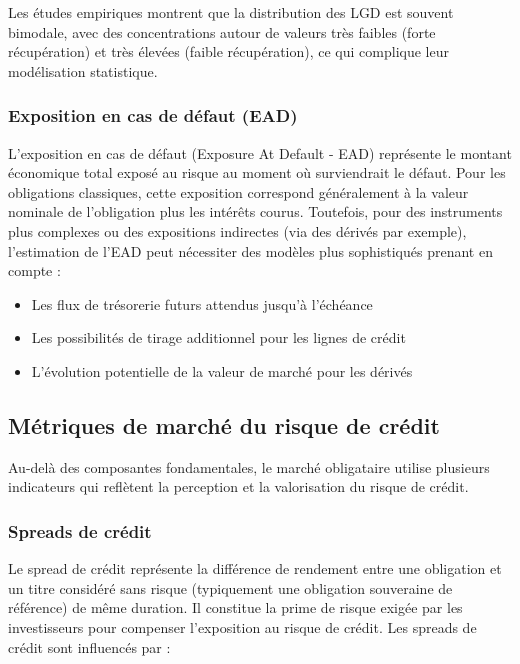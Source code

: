 Les études empiriques montrent que la distribution des LGD est souvent bimodale, avec des concentrations autour de valeurs très faibles (forte récupération) et très élevées (faible récupération), ce qui complique leur modélisation statistique.

\subsubsection{Exposition en cas de défaut (EAD)}

L'exposition en cas de défaut (Exposure At Default - EAD) représente le montant économique total exposé au risque au moment où surviendrait le défaut. Pour les obligations classiques, cette exposition correspond généralement à la valeur nominale de l'obligation plus les intérêts courus. Toutefois, pour des instruments plus complexes ou des expositions indirectes (via des dérivés par exemple), l'estimation de l'EAD peut nécessiter des modèles plus sophistiqués prenant en compte :

\begin{itemize}
    \item Les flux de trésorerie futurs attendus jusqu'à l'échéance
    \item Les possibilités de tirage additionnel pour les lignes de crédit
    \item L'évolution potentielle de la valeur de marché pour les dérivés
\end{itemize}

\subsection{Métriques de marché du risque de crédit}

Au-delà des composantes fondamentales, le marché obligataire utilise plusieurs indicateurs qui reflètent la perception et la valorisation du risque de crédit.

\subsubsection{Spreads de crédit}

Le spread de crédit représente la différence de rendement entre une obligation et un titre considéré sans risque (typiquement une obligation souveraine de référence) de même duration. Il constitue la prime de risque exigée par les investisseurs pour compenser l'exposition au risque de crédit. Les spreads de crédit sont influencés par :


